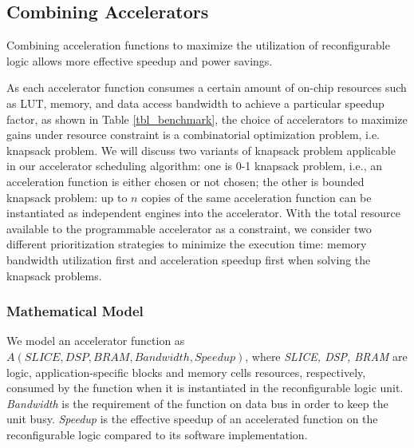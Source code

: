 \subsection{Combining Accelerators}
\label{subsec_combo}



Combining acceleration functions to maximize the utilization of reconfigurable logic
allows more effective speedup and power savings.

As each accelerator function consumes a certain amount of
on-chip resources such as LUT, memory, and data access
bandwidth to achieve a particular speedup factor, as shown in Table
\ref{tbl_benchmark}, the choice of accelerators to maximize gains
under resource constraint is a combinatorial optimization problem, i.e.
knapsack problem. We will discuss two variants of knapsack problem
applicable in our accelerator scheduling algorithm: one is 0-1
knapsack problem, i.e., an acceleration function is either chosen or not
chosen;  the other is bounded knapsack problem: up to $n$ copies of
the same acceleration function can be instantiated as independent
engines into the accelerator. With the total resource available to the programmable accelerator as
a constraint, we consider two different prioritization strategies to minimize the
execution time: memory bandwidth utilization first and acceleration
speedup first when solving the knapsack problems.

\subsubsection{Mathematical Model}

We model an accelerator function as $A(SLICE, DSP, BRAM, Bandwidth, Speedup)$,
where {\em SLICE, DSP, BRAM} are logic, application-specific blocks and
memory cells resources, respectively, consumed by the function when it is
instantiated in the reconfigurable logic unit. {\em Bandwidth} is the
requirement of the function on data bus in order to keep the unit
busy. {\em Speedup} is the effective speedup of an accelerated function on the
reconfigurable logic compared to its software implementation. 


